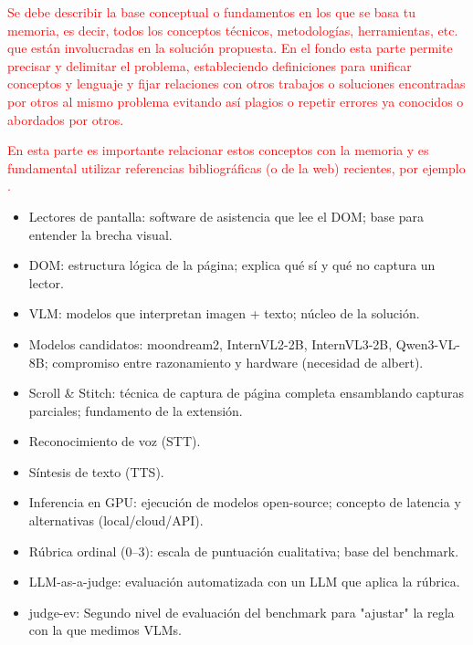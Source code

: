 
\textcolor{red}{Se debe describir la base conceptual o fundamentos en los que se basa tu memoria, es decir, todos los conceptos técnicos, metodologías, herramientas, etc. que están involucradas en la solución propuesta. En el fondo esta parte permite precisar y delimitar el problema, estableciendo definiciones para unificar conceptos y lenguaje y fijar relaciones con otros trabajos o soluciones encontradas por otros al mismo problema evitando así plagios o repetir errores ya conocidos o abordados por otros.}

\textcolor{red}{En esta parte es importante relacionar estos conceptos con la memoria y es fundamental utilizar referencias bibliográficas (o de la web) recientes, por ejemplo \cite{gettelfinger2004will}.}

\begin{itemize}
    \item Lectores de pantalla: software de asistencia que lee el DOM; base para entender la brecha visual.
    \item DOM: estructura lógica de la página; explica qué sí y qué no captura un lector.
    \item VLM: modelos que interpretan imagen + texto; núcleo de la solución.
    \item Modelos candidatos: moondream2, InternVL2-2B, InternVL3-2B, Qwen3-VL-8B; compromiso entre razonamiento y hardware (necesidad de albert).
    \item Scroll \& Stitch: técnica de captura de página completa ensamblando capturas parciales; fundamento de la extensión.
    \item Reconocimiento de voz (STT).
    \item Síntesis de texto (TTS).
    \item Inferencia en GPU: ejecución de modelos open-source; concepto de latencia y alternativas (local/cloud/API).
    \item Rúbrica ordinal (0–3): escala de puntuación cualitativa; base del benchmark.
    \item LLM-as-a-judge: evaluación automatizada con un LLM que aplica la rúbrica.
    \item judge-ev: Segundo nivel de evaluación del benchmark para "ajustar" la regla con la que medimos VLMs.
\end{itemize}
